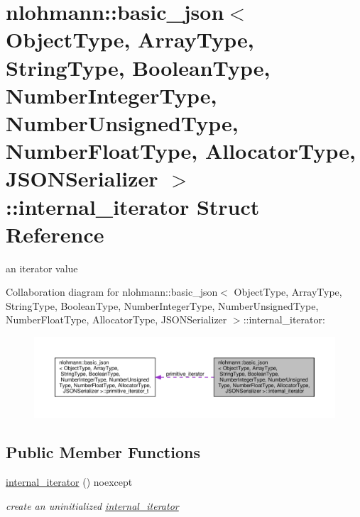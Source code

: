 \hypertarget{structnlohmann_1_1basic__json_1_1internal__iterator}{}\section{nlohmann\+:\+:basic\+\_\+json$<$ Object\+Type, Array\+Type, String\+Type, Boolean\+Type, Number\+Integer\+Type, Number\+Unsigned\+Type, Number\+Float\+Type, Allocator\+Type, J\+S\+O\+N\+Serializer $>$\+:\+:internal\+\_\+iterator Struct Reference}
\label{structnlohmann_1_1basic__json_1_1internal__iterator}


an iterator value  




Collaboration diagram for nlohmann\+:\+:basic\+\_\+json$<$ Object\+Type, Array\+Type, String\+Type, Boolean\+Type, Number\+Integer\+Type, Number\+Unsigned\+Type, Number\+Float\+Type, Allocator\+Type, J\+S\+O\+N\+Serializer $>$\+:\+:internal\+\_\+iterator\+:\nopagebreak
\begin{figure}[H]
\begin{center}
\leavevmode
\includegraphics[width=350pt]{structnlohmann_1_1basic__json_1_1internal__iterator__coll__graph}
\end{center}
\end{figure}
\subsection*{Public Member Functions}
\begin{DoxyCompactItemize}
\item 
\hyperlink{structnlohmann_1_1basic__json_1_1internal__iterator_a95db88d1f886d5b86d34c507af5b3170}{internal\+\_\+iterator} () noexcept
\begin{DoxyCompactList}\small\item\em create an uninitialized \hyperlink{structnlohmann_1_1basic__json_1_1internal__iterator}{internal\+\_\+iterator} \end{DoxyCompactList}\end{DoxyCompactItemize}
